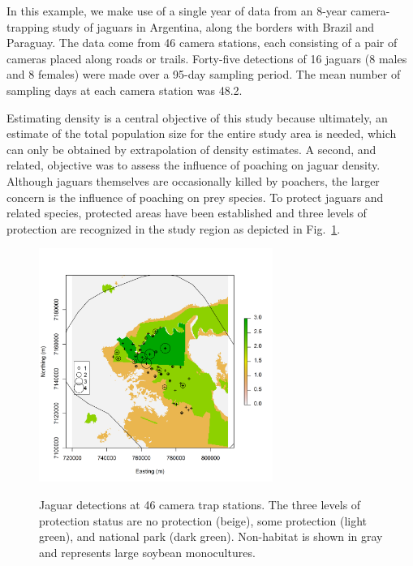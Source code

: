 In this example, we make use of a single year of data from an 8-year
camera-trapping study of jaguars in Argentina,
along the borders with Brazil and Paraguay. The data come from 46
camera stations, each consisting of a pair of cameras placed along
roads or trails. Forty-five detections of 16 jaguars (8 males and 8
females) were made over a 95-day sampling period. The mean number of
sampling days at each camera station was 48.2.

Estimating density is a central objective of this study because
ultimately, an estimate of the total population size for the entire
study area is needed, which can only be obtained by extrapolation of
density estimates. A second, and related, objective was to assess
the influence of poaching on jaguar density. Although jaguars
themselves are occasionally killed by poachers, the larger concern is
the influence of poaching on prey species. To protect jaguars and
related species, protected areas have
been established and three levels of protection are
recognized in the study region as depicted in Fig.~\ref{ch9.fig.jaguarCts}.

\begin{figure}[ht]
\centering
\includegraphics[width=3in,height=3in]{Ch11/figs/jaguarCountMap}
\label{ch9.fig.jaguarCts}
\caption{Jaguar detections at 46 camera trap stations. The three levels of
  protection status are no protection (beige), some protection (light
  green), and national park (dark green). Non-habitat is shown in gray
  and represents large soybean monocultures. }
\end{figure}

